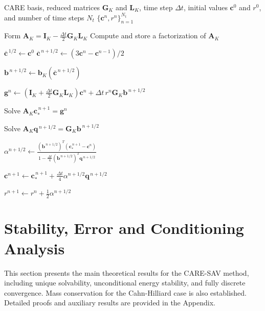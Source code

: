 \documentclass[10pt,reqno]{amsart}
\theoremstyle{remark}
\theoremstyle{definition}
\begin{document}
\begin{algorithm}[t]
\caption{CARE-SAV time integration}
\label{alg:care_sav}
\begin{algorithmic}[1]
\REQUIRE CARE basis, reduced matrices $\boldsymbol{G}_K$ and $\boldsymbol{L}_K$,
         time step $\Delta t$, initial values $\boldsymbol c^0$ and $r^0$,
         and number of time steps $N_t$
\ENSURE $\{\boldsymbol c^n,r^n\}_{n=1}^{N_t}$

\STATE Form $\boldsymbol{A}_K=\boldsymbol{I}_K-\frac{\Delta t}{2}\boldsymbol{G}_K\boldsymbol{L}_K$
\STATE Compute and store a factorization of $\boldsymbol{A}_K$

        \STATE $\overline{\boldsymbol c}^{\,1/2}\gets\boldsymbol c^0$
    \ELSE
        \STATE $\overline{\boldsymbol c}^{\,n+1/2}\gets(3\boldsymbol c^n-\boldsymbol c^{n-1})/2$
    \ENDIF

    \STATE $\boldsymbol b^{\,n+1/2}\gets\boldsymbol b_K(\overline{\boldsymbol c}^{\,n+1/2})$

    \STATE $\boldsymbol g^n\gets\left(\boldsymbol{I}_K+\frac{\Delta t}{2}\boldsymbol{G}_K\boldsymbol{L}_K\right)\boldsymbol c^n
    +\Delta t\,r^n\boldsymbol{G}_K\boldsymbol b^{\,n+1/2}$

    \STATE Solve
    $\boldsymbol{A}_K\boldsymbol c_*^{\,n+1}=\boldsymbol g^n$

    \STATE Solve
    $\boldsymbol{A}_K\boldsymbol q^{\,n+1/2}
    =
    \boldsymbol{G}_K\boldsymbol b^{\,n+1/2}$

    \STATE $\displaystyle
    \alpha^{n+1/2}
    \gets
    \frac{
    (\boldsymbol b^{\,n+1/2})^{T}
    (\boldsymbol c_*^{\,n+1}-\boldsymbol c^n)
    }{
    1-
    \frac{\Delta t}{4}
    (\boldsymbol b^{\,n+1/2})^{T}
    \boldsymbol q^{\,n+1/2}
    }$

    \STATE $\displaystyle
    \boldsymbol c^{n+1}
    \gets
    \boldsymbol c_*^{\,n+1}
    +
    \frac{\Delta t}{4}
    \alpha^{n+1/2}
    \boldsymbol q^{\,n+1/2}$

    \STATE $\displaystyle
    r^{n+1}
    \gets
    r^n+\frac12\alpha^{n+1/2}$
\ENDFOR
\end{algorithmic}
\end{algorithm}


\section{Stability, Error and Conditioning Analysis}
\label{sec:proof}
This section presents the main theoretical results for the CARE-SAV method, including unique solvability, unconditional energy stability, and fully discrete convergence. Mass conservation for the Cahn-Hilliard case is also established. Detailed proofs and auxiliary results are provided in the Appendix.
\end{document}
